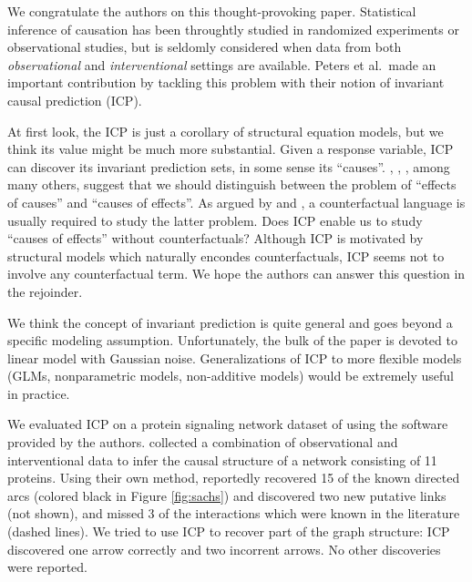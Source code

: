 \documentclass{article}
\begin{document}
\maketitle

\newcommand{\tr}{\text{tr}}
\newcommand{\E}{\textbf{E}}
\newcommand{\diag}{\text{diag}}
\newcommand{\argmax}{\text{argmax}}
\newcommand{\Cov}{\text{Cov}}
\newcommand{\Var}{\text{Var}}
\newcommand{\argmin}{\text{argmin}}
\newcommand{\Vol}{\text{Vol}}
\newcommand{\comm}[1]{}

We congratulate the authors on this thought-provoking
paper. Statistical inference of causation has been throughtly studied
in randomized experiments or observational studies, but is seldomly
considered when data from both \emph{observational}
and \emph{interventional} settings are available. Peters et
al.\ made an important contribution by tackling this problem with
their notion of invariant causal prediction (ICP).

At first look, the ICP is just a corollary of structural
equation models, but we think its value might be much more
substantial. Given a response variable, ICP can discover its invariant
prediction sets, in some sense its
``causes''. \citet{holland1986statistics}, \citet{dawid2000causal},
\citet{pearl2000causality}, among many others, suggest that we should
distinguish between the problem of ``effects of causes'' and ``causes
of effects''. As argued by \citet{robins2000causal} and
\citet{pearl2000causality}, a counterfactual language is usually
required to study the latter problem. Does ICP enable us to study
``causes of effects'' without counterfactuals? Although ICP is
motivated by structural models which naturally encondes
counterfactuals, ICP seems not to involve any counterfactual term. We
hope the authors can answer this question in the rejoinder.

We think the concept of invariant prediction is quite
general and goes beyond a specific modeling assumption. Unfortunately,
the bulk of the paper is devoted to linear model with Gaussian
noise. Generalizations of ICP to more flexible models (GLMs,
nonparametric models, non-additive models) would be extremely useful
in practice.

We evaluated ICP on a protein signaling network dataset of
\citet{sachs2005causal} using the software provided by the authors.
\citet{sachs2005causal} collected a
combination of observational and interventional data to infer the
causal structure of a network consisting of 11 proteins.  Using their
own method, \citet{sachs2005causal} reportedly recovered 15 of the
known directed arcs (colored black in Figure \ref{fig:sachs}) and
discovered two new putative links (not shown), and missed 3 of the
interactions which were known in the literature (dashed lines). We
tried to use ICP to recover part of the graph structure: ICP
discovered one arrow correctly and two incorrent arrows. No other
discoveries were reported.
\end{document}
